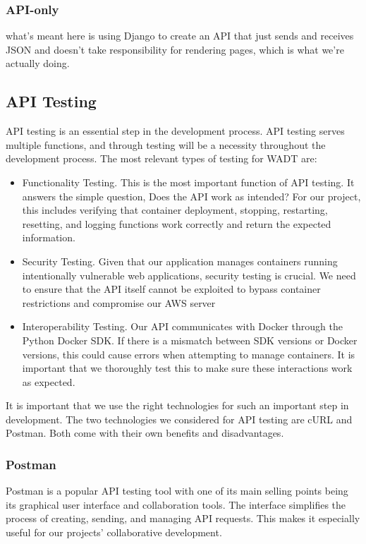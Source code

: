 \documentclass[12pt]{article}
\begin{document}
\subsubsection{API-only}
what's meant here is using Django to create an API that just sends and receives JSON and doesn't take responsibility for rendering pages, which is what we're actually doing.


\subsection{API Testing}

API testing is an essential step in the development process. API testing serves multiple functions, and through testing will be a necessity throughout the development process. The most relevant types of testing for WADT are:
\begin{itemize}
\item Functionality Testing. This is the most important function of API testing. It answers the simple question, Does the API work as intended? For our project, this includes verifying that container deployment, stopping, restarting, resetting, and logging functions work correctly and return the expected information. 
\item Security Testing. Given that our application manages containers running intentionally vulnerable web applications, security testing is crucial. We need to ensure that the API itself cannot be exploited to bypass container restrictions and compromise our AWS server
\item Interoperability Testing. Our API communicates with Docker through the Python Docker SDK. If there is a mismatch between SDK versions or Docker versions, this could cause errors when attempting to manage containers. It is important that we thoroughly test this to make sure these interactions work as expected.
\end{itemize}

It is important that we use the right technologies for such an important step in development. The two technologies we considered for API testing are cURL and Postman. Both come with their own benefits and disadvantages.

\subsubsection{Postman}
Postman is a popular API testing tool with one of its main selling points being its graphical user interface and collaboration tools. The interface simplifies the process of creating, sending, and managing API requests. This makes it especially useful for our projects’ collaborative development.
\end{document}

